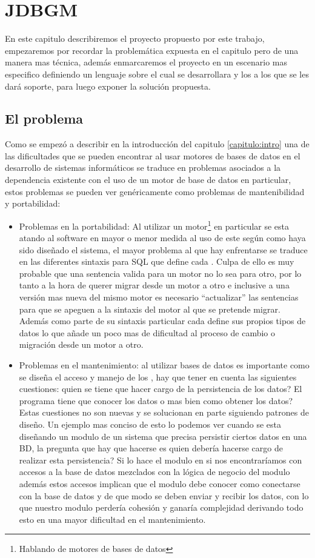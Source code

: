\chapter{JDBGM}
%
%
En este capitulo describiremos el proyecto propuesto por este trabajo, empezaremos por recordar la problemática expuesta en el capitulo  pero de una manera mas técnica, además enmarcaremos el proyecto en un escenario mas especifico definiendo un lenguaje sobre el cual se desarrollara y los \dd a los que se les dará soporte, para luego exponer la solución propuesta.
%
\section{El problema}
%
Como se empezó a describir en la introducción del capitulo \ref{capitulo:intro} una de las dificultades que se pueden encontrar al usar motores de bases de datos en el desarrollo de sistemas informáticos se traduce en problemas asociados a la dependencia existente con el uso de un motor de base de datos en particular, estos problemas se pueden ver genéricamente como problemas de mantenibilidad y portabilidad:
%
\begin{itemize}
%
\item Problemas en la portabilidad: Al utilizar un motor\footnote{Hablando de motores de bases de datos} en particular se esta atando al software en mayor o menor medida al uso de este según como haya sido diseñado el sistema, el mayor problema al que hay enfrentarse se traduce en las diferentes sintaxis para SQL que define cada \dd. Culpa de ello es muy probable que una sentencia valida para un motor no lo sea para otro, por lo tanto a la hora de querer migrar desde un motor a otro e inclusive a una versión mas nueva del mismo motor es necesario  ``actualizar'' las sentencias para que se apeguen a la sintaxis del motor al que se pretende migrar. Además como parte de su sintaxis particular cada \dd define sus propios tipos de datos lo que añade un poco mas de dificultad al proceso de cambio o migración desde un motor a otro.  
%
\item  Problemas en el mantenimiento: al utilizar bases de datos es importante como se diseña el acceso y manejo de los \dd, hay que tener en cuenta las siguientes cuestiones: quien se tiene que hacer cargo de la persistencia de los datos? El programa tiene que conocer los datos o mas bien como obtener los datos? Estas cuestiones no son nuevas y se solucionan en parte siguiendo patrones de diseño. Un ejemplo mas conciso de esto lo podemos ver cuando se esta diseñando un modulo de un sistema que precisa persistir ciertos datos en una BD, la pregunta que hay que hacerse es quien debería hacerse cargo de realizar esta persistencia? Si lo hace el modulo en si nos encontraríamos con accesos a la base de datos mezclados con la lógica de negocio del modulo además estos accesos implican que el modulo debe conocer como conectarse con la base de datos y de que modo se deben enviar y recibir los datos, con lo que nuestro modulo	perdería cohesión y ganaría complejidad derivando todo esto en una mayor dificultad en el mantenimiento.
\end{itemize}
